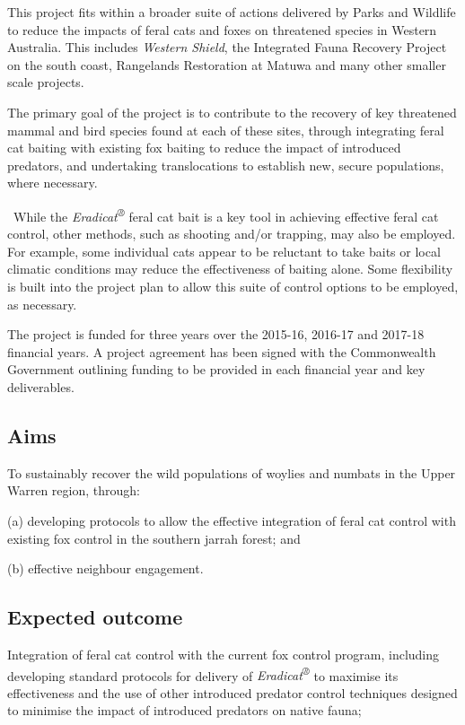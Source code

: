\documentclass[version=last,
    paper=a4,                               %
    10pt,                                   %
    dvipsnames,
    oneside,                              %
    headings=openany,                       %
    open=any,
    BCOR=7mm,                               %
    DIV=15,     %
]{scrbook}
\begin{document}
This project fits within a broader suite of actions delivered by Parks
and Wildlife to reduce the impacts of feral cats and foxes on threatened
species in Western Australia. This includes \emph{Western Shield}, the
Integrated Fauna Recovery Project on the south coast, Rangelands
Restoration at Matuwa and many other smaller scale projects.

The primary goal of the project is to contribute to the recovery of key
threatened mammal and bird species found at each of these sites, through
integrating feral cat baiting with existing fox baiting to reduce the
impact of introduced predators, and undertaking translocations to
establish new, secure populations, where necessary.

~While the \emph{Eradicat\textsuperscript{®}} feral cat bait is a key
tool in achieving effective feral cat control, other methods, such as
shooting and/or trapping, may also be employed. For example, some
individual cats appear to be reluctant to take baits or local climatic
conditions may reduce the effectiveness of baiting alone. Some
flexibility is built into the project plan to allow this suite of
control options to be employed, as necessary.

The project is funded for three years over the 2015-16, 2016-17 and
2017-18 financial years. A project agreement has been signed with the
Commonwealth Government outlining funding to be provided in each
financial year and key deliverables.




\subsection*{Aims}

To sustainably recover the wild populations of woylies and numbats in
the Upper Warren region, through:

(a) developing protocols to allow the effective integration of feral cat
control with existing fox control in the southern jarrah forest; and

(b) effective neighbour engagement.




\subsection*{Expected outcome}

Integration of feral cat control with the current fox control program,
including developing standard protocols for delivery of
\emph{Eradicat\textsuperscript{®}} to maximise its effectiveness and the
use of other introduced predator control techniques designed to minimise
the impact of introduced predators on native fauna;
\end{document}
